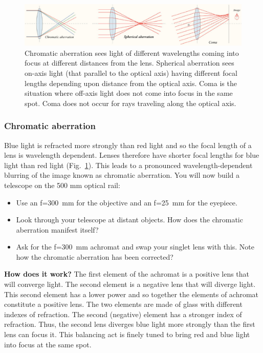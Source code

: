 \documentclass[a4paper]{report}
\begin{document}
\begin{figure}[h]
\center
\includegraphics[width=6in]{aberrations.eps}
\caption{ 
Chromatic aberration sees light of different wavelengths coming into focus at different distances from the lens.
Spherical aberration sees on-axis light (that parallel to the optical axis) having different focal lengths depending upon distance from the optical axis. 
Coma is the situation where off-axis light does not come into focus in the same spot. Coma does not occur for rays traveling along the optical axis.}
\label{fig:aberrations}
\end{figure}



\subsubsection{Chromatic aberration}
Blue light is refracted more strongly than red light and so the focal length of a lens is wavelength dependent. 
Lenses therefore have shorter focal lengths for blue light than red light (Fig.~\ref{fig:aberrations}).
This leads to a pronounced wavelength-dependent blurring of the image known as chromatic aberration. 
You will now build a telescope on the 500 mm optical rail:
\begin{itemize}
\item Use an f=300~mm for the objective and an f=25~mm for the eyepiece. 
\item Look through your telescope at distant objects. How does the chromatic aberration manifest itself?
\item Ask for the f=300~mm achromat and swap your singlet lens with this. Note how the chromatic aberration has been corrected? 
\end{itemize}

\textbf{How does it work?} 
The first element of the achromat is a positive lens that will converge light. 
The second element is a negative lens that will diverge light.
This second element has a lower power and so together the elements of achromat constitute a positive lens. 
The two elements are made of glass with different indexes of refraction. 
The second (negative) element has a stronger index of refraction. 
Thus, the second lens diverges blue light more strongly than the first lens can focus it.
This balancing act is finely tuned to bring red and blue light into focus at the same spot.
\end{document}
